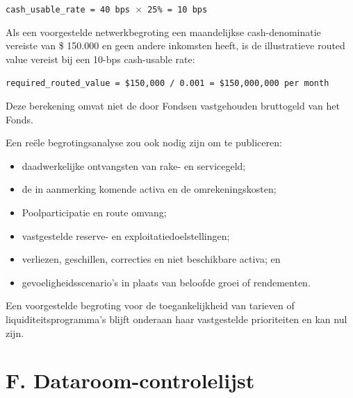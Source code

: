 \documentclass[11pt]{article}
\begin{document}
\texttt{cash\_usable\_rate = 40 bps $\times$ 25\% = 10 bps}

Als een voorgestelde netwerkbegroting een maandelijkse cash-denominatie vereiste van \$ 150.000 en geen andere inkomsten heeft, is de illustratieve routed value vereist bij een 10-bps cash-usable rate:

\texttt{required\_routed\_value = \$150,000 / 0.001 = \$150,000,000 per month}

Deze berekening omvat niet de door Fondsen vastgehouden bruttogeld van het Fonds.

Een reële begrotingsanalyse zou ook nodig zijn om te publiceren:

\begin{itemize}[leftmargin=*]
\item daadwerkelijke ontvangsten van rake- en servicegeld;
\item de in aanmerking komende activa en de omrekeningskosten;
\item Poolparticipatie en route omvang;
\item vastgestelde reserve- en exploitatiedoelstellingen;
\item verliezen, geschillen, correcties en niet beschikbare activa; en
\item gevoeligheidsscenario's in plaats van beloofde groei of rendementen.
\end{itemize}
Een voorgestelde begroting voor de toegankelijkheid van tarieven of liquiditeitsprogramma's blijft onderaan haar vastgestelde prioriteiten en kan nul zijn.


\section*{F. Dataroom-controlelijst}
\end{document}
